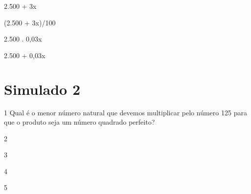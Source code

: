 \begin{escolha}
\item 2.500 + 3x
\item (2.500 + 3x)/100
\item 2.500 . 0,03x
\item 2.500 + 0,03x
\end{escolha}








\mbox{}



\pagebreak

\section*{Simulado 2}

\num{1} Qual é o menor número natural que devemos multiplicar pelo número 125
para que o produto seja um número quadrado perfeito?

\begin{escolha}
\item 2
\item 3
\item 4
\item 5
\end{escolha}



